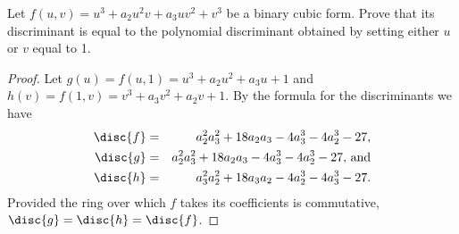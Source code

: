 \documentclass[10pt]{amsart}
\begin{document}
\begin{thm}
  Let $f(u,v) = u^3 + a_2u^2v + a_3uv^2 + v^3$ be a binary cubic form.
  Prove that its discriminant is equal to the polynomial discriminant obtained by setting either $u$ or $v$ equal to 1.

  \begin{proof}
    Let $g(u) = f(u,1) = u^3 + a_2u^2 + a_3u + 1$ and $h(v) = f(1,v) = v^3 + a_3v^2 + a_2v + 1$.
    By the formula for the discriminants we have
    \begin{eqnarray*}
      \disc{f} &=& a_2^{2}a_3^{2} + 18a_2a_3 - 4 a_3^{3} - 4a_2^{3} - 27,\\
      \disc{g} &=& a_2^{2}a_3^{2} + 18a_2a_3 - 4 a_3^{3} - 4a_2^{3} - 27,\, \text{and}\\
      \disc{h} &=& a_3^{2}a_2^{2} + 18a_3a_2 - 4 a_2^{3} - 4a_3^{3} - 27.
    \end{eqnarray*}
    Provided the ring over which $f$ takes its coefficients is commutative, $\disc{g} = \disc{h} = \disc{f}$.
  \end{proof}
\end{thm}
\end{document}
